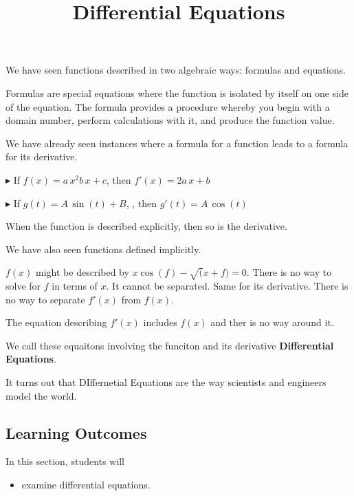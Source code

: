 \documentclass{ximera}
\title{Differential Equations}
\begin{document}
\begin{abstract}
\end{abstract}
\maketitle




We have seen functions described in two algebraic ways: formulas and equations.


Formulas are special equations where the function is isolated by itself on one side of the equation.  The formula provides a procedure whereby you begin with a domain number, perform calculations with it, and produce the function value.

We have already seen instances where a formula for a function leads to a formula for its derivative. 

$\blacktriangleright$ If $f(x) = a \, x^2  b \, x + c$, then $f'(x) = 2a \, x + b$

$\blacktriangleright$ If $g(t) = A \, \sin(t) + B$, , then $g'(t) = A \, \cos(t)$


When the function is described explicitly, then so is the derivative.


We have also seen functions defined implicitly.


$f(x)$ might be described by $x \cos(f) - \sqrt(x + f) = 0$.  There is no way to solve for $f$ in terms of $x$. It cannot be separated.  Same for its derivative. There is no way to separate $f'(x)$ from $f(x)$.

The equation describing $f'(x)$ includes $f(x)$ and ther is no way around it.


We call these equaitons involving the funciton and its derivative \textbf{Differential Equations}.

It turns out that DIffernetial Equations are the way scientists and engineers model the world.










\subsection{Learning Outcomes}


\begin{sectionOutcomes}
In this section, students will 

\begin{itemize}
\item examine differential equations.
\end{itemize}
\end{sectionOutcomes}
\end{document}
